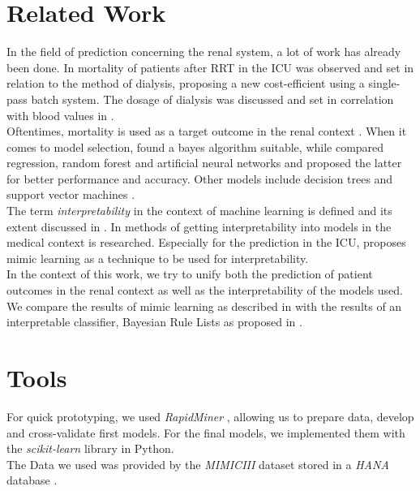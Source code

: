\documentclass[conference,comsoc]{IEEEtran}
\begin{document}
\section{Related Work}
\label{sec:related}
In the field of prediction concerning the renal system, a lot of work has already been done.
In \cite{Schwenger2012} mortality of patients after RRT in the ICU was observed and set in relation to the method of dialysis, proposing a new cost-efficient using a single-pass batch system. The dosage of dialysis was discussed and set in correlation with blood values in \cite{Ricci2006}. \\
Oftentimes, mortality is used as a target outcome in the renal context \cite{Barrett1997} \cite{Lakshmi2014} \cite{Kusiak2005}.
When it comes to model selection, \cite{Baby2015} found a bayes algorithm suitable, while \cite{Lakshmi2014} compared regression, random forest and artificial neural networks and proposed the latter for better performance and accuracy. Other models include decision trees \cite{Greco2010} and support vector machines \cite{Vijayarani2015} \cite{Sinha2015}. \\
The term \emph{interpretability} in the context of machine learning is defined and its extent discussed in \cite{Lipton2016}. In \cite{Katuwal2016} methods of getting interpretability into models in the medical context is researched. Especially for the prediction in the ICU, \cite{Che2016} proposes mimic learning as a technique to be used for interpretability. \\

In the context of this work, we try to unify both the prediction of patient outcomes in the renal context as well as the interpretability of the models used.
We compare the results of mimic learning as described in \cite{Che2016} with the results of an interpretable classifier, Bayesian Rule Lists as proposed in \cite{Letham2015}.


\section{Tools}
\label{sec:methods}
For quick prototyping, we used \emph{RapidMiner} \cite{RapidMiner}, allowing us to prepare data, develop and cross-validate first models. 
For the final models, we implemented them with the \emph{scikit-learn} library \cite{SKLearn} in Python. \\
The Data we used was provided by the \emph{MIMICIII} dataset \cite{Johnson2016} stored in a \emph{HANA} database \cite{Farber2012}.
\end{document}

